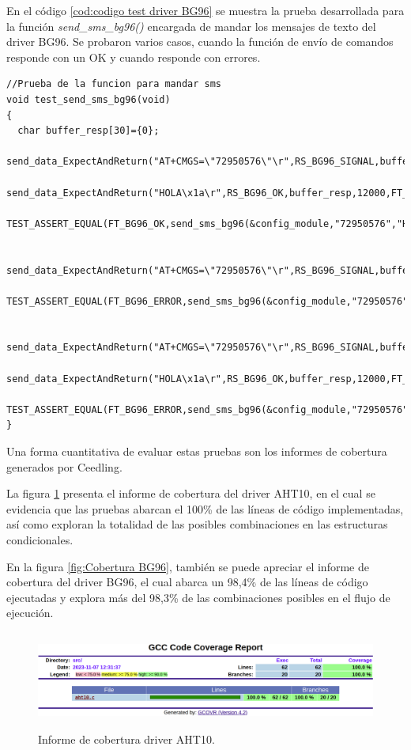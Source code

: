 En el código \ref{cod:codigo test driver BG96} se muestra la prueba desarrollada para la función \emph{send\_sms\_bg96()} encargada de mandar los mensajes de texto del driver BG96. Se probaron varios casos, cuando la función de envío de comandos responde con un OK y cuando responde con errores.
\begin{lstlisting}[label=cod:codigo test driver BG96,caption=Tests del driver del módulo BG96.] 
//Prueba de la funcion para mandar sms  
void test_send_sms_bg96(void)
{
  char buffer_resp[30]={0};
  send_data_ExpectAndReturn("AT+CMGS=\"72950576\"\r",RS_BG96_SIGNAL,buffer_resp,12000,FT_BG96_OK);
  send_data_ExpectAndReturn("HOLA\x1a\r",RS_BG96_OK,buffer_resp,12000,FT_BG96_OK);
  TEST_ASSERT_EQUAL(FT_BG96_OK,send_sms_bg96(&config_module,"72950576","HOLA"));

  send_data_ExpectAndReturn("AT+CMGS=\"72950576\"\r",RS_BG96_SIGNAL,buffer_resp,12000,FT_BG96_ERROR);
  TEST_ASSERT_EQUAL(FT_BG96_ERROR,send_sms_bg96(&config_module,"72950576","HOLA"));

  send_data_ExpectAndReturn("AT+CMGS=\"72950576\"\r",RS_BG96_SIGNAL,buffer_resp,12000,FT_BG96_OK);
  send_data_ExpectAndReturn("HOLA\x1a\r",RS_BG96_OK,buffer_resp,12000,FT_BG96_ERROR);
  TEST_ASSERT_EQUAL(FT_BG96_ERROR,send_sms_bg96(&config_module,"72950576","HOLA"));
}
\end{lstlisting}

Una forma cuantitativa de evaluar estas pruebas son los informes de cobertura generados por Ceedling.

La figura \ref{fig:Cobertura aht10} presenta el informe de cobertura del driver AHT10, en el cual se evidencia que las pruebas abarcan el 100\% de las líneas de código implementadas, así como exploran la totalidad de las posibles combinaciones en las estructuras condicionales.

En la figura \ref{fig:Cobertura BG96}, también se puede apreciar el informe de cobertura del driver BG96, el cual abarca un 98,4\% de las líneas de código ejecutadas y explora más del 98,3\% de las combinaciones posibles en el flujo de ejecución.

\begin{figure}[h!]
    \centering
      \includegraphics[width=\linewidth, height=3.2cm]{./Figures/cobertura_aht10_2.png}
    \caption{Informe de cobertura driver AHT10.}
      \label{fig:Cobertura aht10}
  \end{figure}


